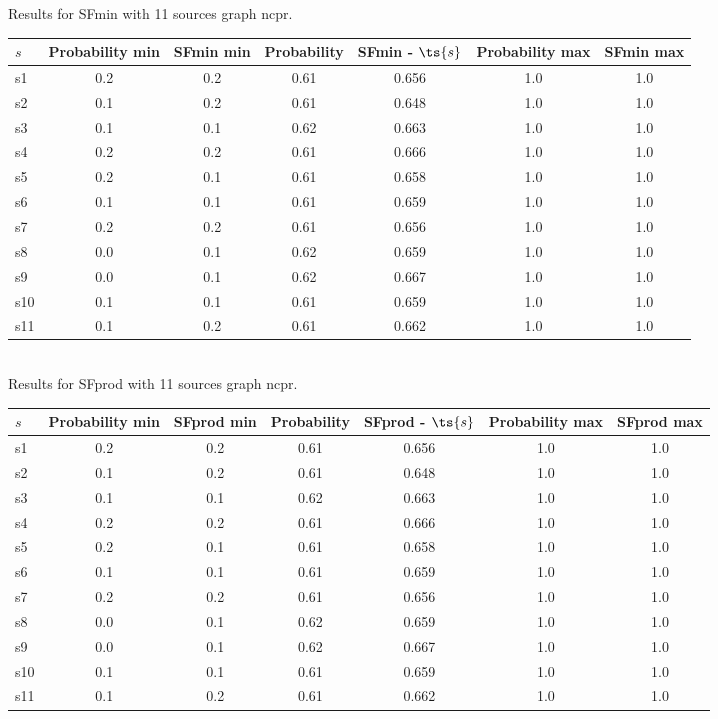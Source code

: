 \documentclass{article}
\begin{document}
\noindent Results for SFmin with 11 sources graph ncpr.

\noindent\begin{tabular}{|l|c|c|c|c|c|c|}
\hline
$s$& Probability min & SFmin min & Probability & SFmin - $\ts{s}$ & Probability max & SFmin max\\
\hline
s1 &0.2 & 0.2 & 0.61 & 0.656 & 1.0 & 1.0\\
\hline
s2 &0.1 & 0.2 & 0.61 & 0.648 & 1.0 & 1.0\\
\hline
s3 &0.1 & 0.1 & 0.62 & 0.663 & 1.0 & 1.0\\
\hline
s4 &0.2 & 0.2 & 0.61 & 0.666 & 1.0 & 1.0\\
\hline
s5 &0.2 & 0.1 & 0.61 & 0.658 & 1.0 & 1.0\\
\hline
s6 &0.1 & 0.1 & 0.61 & 0.659 & 1.0 & 1.0\\
\hline
s7 &0.2 & 0.2 & 0.61 & 0.656 & 1.0 & 1.0\\
\hline
s8 &0.0 & 0.1 & 0.62 & 0.659 & 1.0 & 1.0\\
\hline
s9 &0.0 & 0.1 & 0.62 & 0.667 & 1.0 & 1.0\\
\hline
s10 &0.1 & 0.1 & 0.61 & 0.659 & 1.0 & 1.0\\
\hline
s11 &0.1 & 0.2 & 0.61 & 0.662 & 1.0 & 1.0\\
\hline
\end{tabular}\\

\noindent Results for SFprod with 11 sources graph ncpr.

\noindent\begin{tabular}{|l|c|c|c|c|c|c|}
\hline
$s$& Probability min & SFprod min & Probability & SFprod - $\ts{s}$ & Probability max & SFprod max\\
\hline
s1 &0.2 & 0.2 & 0.61 & 0.656 & 1.0 & 1.0\\
\hline
s2 &0.1 & 0.2 & 0.61 & 0.648 & 1.0 & 1.0\\
\hline
s3 &0.1 & 0.1 & 0.62 & 0.663 & 1.0 & 1.0\\
\hline
s4 &0.2 & 0.2 & 0.61 & 0.666 & 1.0 & 1.0\\
\hline
s5 &0.2 & 0.1 & 0.61 & 0.658 & 1.0 & 1.0\\
\hline
s6 &0.1 & 0.1 & 0.61 & 0.659 & 1.0 & 1.0\\
\hline
s7 &0.2 & 0.2 & 0.61 & 0.656 & 1.0 & 1.0\\
\hline
s8 &0.0 & 0.1 & 0.62 & 0.659 & 1.0 & 1.0\\
\hline
s9 &0.0 & 0.1 & 0.62 & 0.667 & 1.0 & 1.0\\
\hline
s10 &0.1 & 0.1 & 0.61 & 0.659 & 1.0 & 1.0\\
\hline
s11 &0.1 & 0.2 & 0.61 & 0.662 & 1.0 & 1.0\\
\hline
\end{tabular}\\
\end{document}
